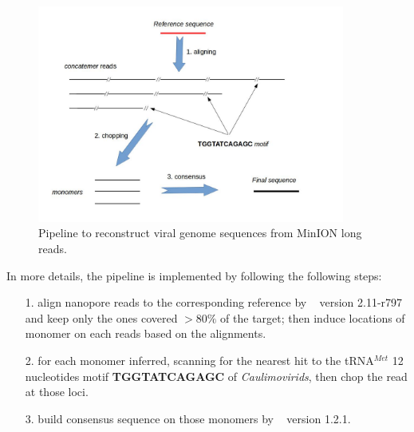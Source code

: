 \begin{figure}[ht]
\centerline{\includegraphics[width=0.9\textwidth]{images/concatemer.jpg}}
\caption{Pipeline to reconstruct viral genome sequences from MinION long reads.}
\label{fig:concat_ref_workflow}
\end{figure}

In more details, the pipeline is implemented by following the following steps: 
\begin{itemize}
\item[1.] align nanopore reads to the corresponding reference by \minimap{}~\cite{Li2016} version 2.11-r797 and keep only the ones covered $>80\%$ of the target; then induce locations of monomer on each reads based on the alignments.
\item[2.] for each monomer inferred, scanning for the nearest hit to the tRNA$^{Met}$ 12 nucleotides motif \textbf{TGGTATCAGAGC} of \emph{Caulimovirids}, then chop the read at those loci.
\item[3.] build consensus sequence on those monomers by \racon{}~\cite{Vaser2017racon} version 1.2.1.
\end{itemize}

